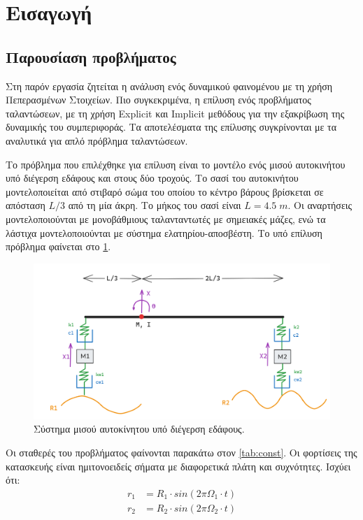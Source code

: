 \documentclass{article}
\begin{document}

\tableofcontents


\section{Εισαγωγή}
\subsection{Παρουσίαση προβλήματος}

Στη παρόν εργασία ζητείται η ανάλυση ενός δυναμικού φαινομένου με τη χρήση Πεπερασμένων Στοιχείων. Πιο συγκεκριμένα, η επίλυση ενός προβλήματος ταλαντώσεων, με τη χρήση Explicit και Implicit μεθόδους για την εξακρίβωση της δυναμικής του συμπεριφοράς. Τα αποτελέσματα της επίλυσης συγκρίνονται με τα αναλυτικά για απλό πρόβλημα ταλαντώσεων.
\par Το πρόβλημα που επιλέχθηκε για επίλυση είναι το μοντέλο ενός μισού αυτοκινήτου υπό διέγερση εδάφους και στους δύο τροχούς. Το σασί του αυτοκινήτου μοντελοποιείται από στιβαρό σώμα του οποίου το κέντρο βάρους βρίσκεται σε απόσταση $L/3$ από τη μία άκρη. Το μήκος του σασί είναι $L = 4.5\; m$. Οι αναρτήσεις μοντελοποιούνται με μονοβάθμιους ταλανταντωτές με σημειακές μάζες, ενώ τα λάστιχα μοντελοποιούνται με σύστημα ελατηρίου-αποσβέστη. Το υπό επίλυση πρόβλημα φαίνεται στο \ref{fig:halfCar}.

\begin{figure}[H]
    \centering
    \includegraphics[width=0.8\linewidth]{media/halfCar.png}
    \caption{Σύστημα μισού αυτοκίνητου υπό διέγερση εδάφους.}
    \label{fig:halfCar}
\end{figure}

Οι σταθερές του προβλήματος φαίνονται παρακάτω στον \ref{tab:const}. Οι φορτίσεις της κατασκευής είναι ημιτονοειδείς σήματα με διαφορετικά πλάτη και συχνότητες. Ισχύει ότι:
\begin{equation}
\begin{aligned}
    r_1 &= R_1 \cdot sin(2\pi\Omega_1 \cdot t) \\
    r_2 &= R_2 \cdot sin(2\pi\Omega_2 \cdot t) 
\end{aligned}
\end{equation}
\end{document}
